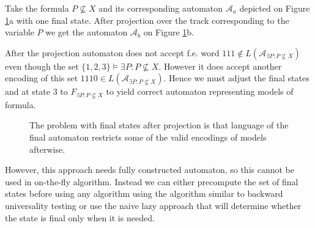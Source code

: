 \noindent\hrulefill
\begin{example}
 Take the formula $P \not\subseteq X$ and its corresponding automaton
 $\mathcal{A}_a$ depicted on Figure \ref{projection}a with one final state.
 After projection over the track corresponding to the variable $P$ we get the
 automaton $\mathcal{A}_b$ on Figure \ref{projection}b.
 
 After the projection automaton does not accept f.e. word $111 \notin
 L(\mathcal{A}_{\exists P: P \not\subseteq X})$ even though the set $\{1, 2,
 3\} \models \exists P: P \not\subseteq X$. However it does accept another
 encoding of this set $1110 \in L(\mathcal{A}_{\exists P: P \not\subseteq X})$.
 Hence we must adjust the final states and at state $3$ to $F_{\exists P: P
 \not\subseteq X}$ to yield correct automaton representing models of formula.
 
 \begin{figure}[h!]
  \begin{center}
  \end{center}
  \caption{The problem with final states after projection is that
  language of the final automaton restricts some of the valid encodings
  of models afterwise.}\label{projection}
 \end{figure}\label{models}
 
\end{example}

\noindent\hrulefill

However, this approach needs fully constructed automaton, so this cannot be used
in on-the-fly algorithm. Instead we can either precompute the set of final
states before using any algorithm using the algorithm similar to backward
universality testing \cite{backwards-universality} or use the naive lazy
approach that will determine whether the state is final only when it is needed.

